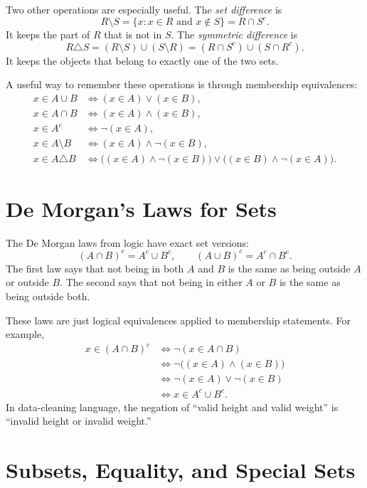 Two other operations are especially useful. The \emph{set difference} is
\[
    R\setminus S=\{x:x\in R\text{ and }x\notin S\}=R\cap S^c.
\]
It keeps the part of \(R\) that is not in \(S\). The \emph{symmetric difference} is
\[
    R\triangle S=(R\setminus S)\cup(S\setminus R)
    =(R\cap S^c)\cup(S\cap R^c).
\]
It keeps the objects that belong to exactly one of the two sets.
\label{mf:set-difference}
\label{mf:set-symmetric-difference}

A useful way to remember these operations is through membership equivalences:
\[
\begin{aligned}
    x\in A\cup B &\Longleftrightarrow (x\in A)\lor(x\in B),\\
    x\in A\cap B &\Longleftrightarrow (x\in A)\land(x\in B),\\
    x\in A^c &\Longleftrightarrow \neg(x\in A),\\
    x\in A\setminus B &\Longleftrightarrow (x\in A)\land\neg(x\in B),\\
    x\in A\triangle B &\Longleftrightarrow \bigl((x\in A)\land\neg(x\in B)\bigr)\lor\bigl((x\in B)\land\neg(x\in A)\bigr).
\end{aligned}
\]

\section{De Morgan's Laws for Sets}
\label{mf:set-demorgan}

The De Morgan laws from logic have exact set versions:
\[
    (A\cap B)^c=A^c\cup B^c,
    \qquad
    (A\cup B)^c=A^c\cap B^c.
\]
The first law says that not being in both \(A\) and \(B\) is the same as being outside \(A\) or outside \(B\). The second says that not being in either \(A\) or \(B\) is the same as being outside both.

These laws are just logical equivalences applied to membership statements. For example,
\[
\begin{aligned}
    x\in(A\cap B)^c
    &\Longleftrightarrow \neg(x\in A\cap B)\\
    &\Longleftrightarrow \neg\bigl((x\in A)\land(x\in B)\bigr)\\
    &\Longleftrightarrow \neg(x\in A)\lor\neg(x\in B)\\
    &\Longleftrightarrow x\in A^c\cup B^c.
\end{aligned}
\]
In data-cleaning language, the negation of ``valid height and valid weight'' is ``invalid height or invalid weight.''

\section{Subsets, Equality, and Special Sets}
\label{mf:subsets}
\label{mf:set-equality}
\label{mf:special-sets}


